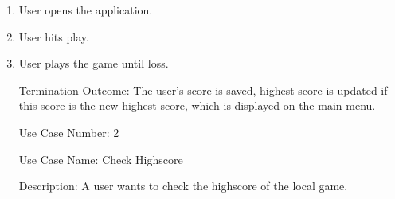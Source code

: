 \documentclass[10pt,conference,onecolumn,compsoc]{IEEEtran}
\begin{document}
\begin{enumerate}
\item User opens the application.
\item User hits play.
\item User plays the game until loss.
\item[Termination Outcome:] The user's score is saved, highest score is updated if this score is the new highest score, which is displayed on the main menu. 
\end{enumerate}

\begin{itemize}
\item[Use Case Number:] 2
\item[Use Case Name:] Check Highscore
\item[Description:] A user wants to check the highscore of the local game.
\end{itemize}
\end{document}
